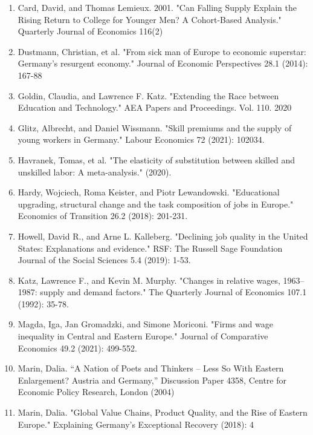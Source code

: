 \documentclass{article}
\begin{document}
\begin{enumerate}
\item Card, David, and Thomas Lemieux. 2001. "Can Falling Supply Explain the Rising Return to College for Younger Men? A Cohort-Based Analysis." Quarterly Journal of Economics 116(2)

\item Dustmann, Christian, et al. "From sick man of Europe to economic superstar: Germany's resurgent economy." Journal of Economic Perspectives 28.1 (2014): 167-88

\item Goldin, Claudia, and Lawrence F. Katz. "Extending the Race between Education and Technology." AEA Papers and Proceedings. Vol. 110. 2020

\item Glitz, Albrecht, and Daniel Wissmann. "Skill premiums and the supply of young workers in Germany." Labour Economics 72 (2021): 102034.

\item Havranek, Tomas, et al. "The elasticity of substitution between skilled and unskilled labor: A meta-analysis." (2020).

\item Hardy, Wojciech, Roma Keister, and Piotr Lewandowski. "Educational upgrading, structural change and the task composition of jobs in Europe." Economics of Transition 26.2 (2018): 201-231.

\item Howell, David R., and Arne L. Kalleberg. "Declining job quality in the United States: Explanations and evidence." RSF: The Russell Sage Foundation Journal of the Social Sciences 5.4 (2019): 1-53.

\item Katz, Lawrence F., and Kevin M. Murphy. "Changes in relative wages, 1963–1987: supply and demand factors." The Quarterly Journal of Economics 107.1 (1992): 35-78.

\item Magda, Iga, Jan Gromadzki, and Simone Moriconi. "Firms and wage inequality in Central and Eastern Europe." Journal of Comparative Economics 49.2 (2021): 499-552.

\item Marin, Dalia. “A Nation of Poets and Thinkers – Less So With Eastern Enlargement? Austria and Germany,” Discussion Paper 4358, Centre for Economic Policy Research, London (2004)

\item Marin, Dalia. "Global Value Chains, Product Quality, and the Rise of Eastern Europe." Explaining Germany’s Exceptional Recovery (2018): 4


\end{enumerate}
\end{document}
